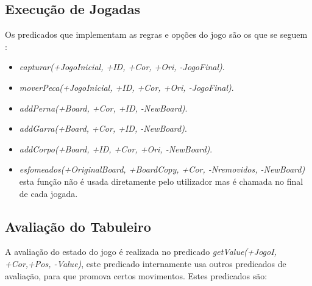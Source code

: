\documentclass[a4paper]{article}
\begin{document}
\newpage

\subsection{Execução de Jogadas} Os predicados que implementam as regras e opções do jogo são os que se seguem :
\begin{itemize}
    \item \textit{capturar(+JogoInicial, +ID, +Cor, +Ori, -JogoFinal)}.
    \item \textit{moverPeca(+JogoInicial, +ID, +Cor, +Ori, -JogoFinal)}.
    \item \textit{addPerna(+Board, +Cor, +ID, -NewBoard)}.
    \item \textit{addGarra(+Board, +Cor, +ID, -NewBoard)}.
    \item \textit{addCorpo(+Board, +ID, +Cor, +Ori, -NewBoard)}.
    \item \textit{esfomeados(+OriginalBoard, +BoardCopy, +Cor, -Nremovidos, -NewBoard)} esta função não é usada diretamente pelo utilizador mas é chamada no final de cada jogada.
\end{itemize}

\subsection{Avaliação do Tabuleiro}\label{evalTab}

A avaliação do estado do jogo é realizada no predicado  \textit{getValue(+JogoI, +Cor,+Pos, -Value)}, este predicado internamente usa outros predicados de avaliação, para que promova certos movimentos. Estes predicados são:
\end{document}
